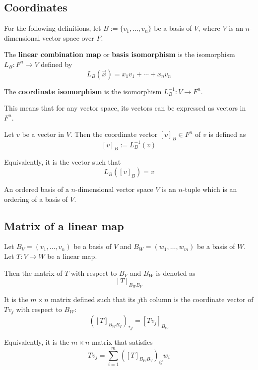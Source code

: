 \subsection{Coordinates}

For the following definitions, let $B := \{ v_1, \ldots, v_n \}$ be a basis of $V$, where $V$ is an $n$-dimensional vector space over $F$.

\begin{definition}
  The \textbf{linear combination map} or \textbf{basis isomorphism} is the isomorphism $L_B : F^n \to V$ defined by
  \[
    L_B(\vec{x}) = x_1 v_1 + \cdots + x_n v_n
  \]
\end{definition}

\begin{definition}
  The \textbf{coordinate isomorphism} is the isomorphism $L_B^{-1} : V \to 
  F^n$.

  This means that for any vector space, its vectors can be expressed as vectors in $F^n$.
\end{definition}

\begin{definition}
  Let $v$ be a vector in $V$. Then the coordinate vector $[v]_B \in F^n$ of $v$ is defined as 
  \[
    [v]_B := L_B^{-1}(v)
  \]

  Equivalently, it is the vector such that
  \[
    L_B([v]_B) = v
  \]
\end{definition}

\begin{definition}
  An ordered basis of a $n$-dimensional vector space $V$ is an $n$-tuple which is an ordering of a basis of $V$.
\end{definition}

\subsection{Matrix of a linear map}

\begin{definition}
  Let $B_V = (v_1, \ldots, v_n)$ be a basis of $V$ and $B_W = (w_1, \ldots, w_m)$ be a basis of $W$. Let $T : V \to W$ be a linear map.
  
  Then the matrix of $T$ with respect to $B_V$ and $B_W$ is denoted as
  \[
    [T]_{B_W B_V}
  \]
  
  It is the $m \times n$ matrix defined such that its $j$th column is the coordinate vector of $T v_j$ with respect to $B_W$:
  \[
    \left([T]_{B_W B_V}\right)_{*j} = [T v_j]_{B_W}
  \]

  Equivalently, it is the $m \times n$ matrix that satisfies
  \[
    T v_j = \sum_{i = 1}^m \left([T]_{B_W B_V}\right)_{ij} w_i
  \]
\end{definition}

